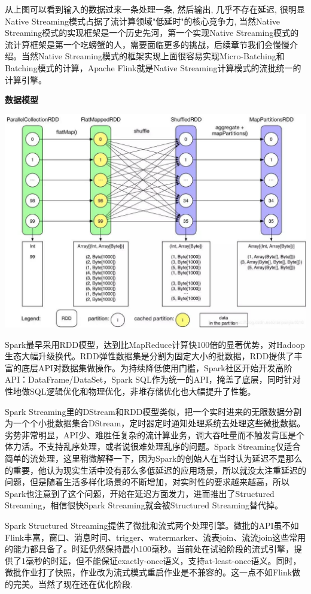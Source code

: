 \documentclass[oneside]{ctexbook}
\begin{document}
从上图可以看到输入的数据过来一条处理一条, 然后输出, 几乎不存在延迟, 很明显Native Streaming模式占据了流计算领域"低延时"的核心竞争力, 当然Native Streaming模式的实现框架是一个历史先河，第一个实现Native Streaming模式的流计算框架是第一个吃螃蟹的人，需要面临更多的挑战，后续章节我们会慢慢介绍。当然Native Streaming模式的框架实现上面很容易实现Micro-Batching和Batching模式的计算，Apache Flink就是Native Streaming计算模式的流批统一的计算引擎。

\textbf{数据模型}

\noindent \includegraphics[width=\textwidth]{shujumoxing1.jpg}

Spark最早采用RDD模型，达到比MapReduce计算快100倍的显著优势，对Hadoop生态大幅升级换代。RDD弹性数据集是分割为固定大小的批数据，RDD提供了丰富的底层API对数据集做操作。为持续降低使用门槛，Spark社区开始开发高阶API：DataFrame/DataSet，Spark SQL作为统一的API，掩盖了底层，同时针对性地做SQL逻辑优化和物理优化，非堆存储优化也大幅提升了性能。

Spark Streaming里的DStream和RDD模型类似，把一个实时进来的无限数据分割为一个个小批数据集合DStream，定时器定时通知处理系统去处理这些微批数据。劣势非常明显，API少、难胜任复杂的流计算业务，调大吞吐量而不触发背压是个体力活。不支持乱序处理，或者说很难处理乱序的问题。Spark Streaming仅适合简单的流处理，这里稍微解释一下，因为Spark的创始人在当时认为延迟不是那么的重要，他认为现实生活中没有那么多低延迟的应用场景，所以就没太注重延迟的问题，但是随着生活多样化场景的不断增加，对实时性的要求越来越高，所以Spark也注意到了这个问题，开始在延迟方面发力，进而推出了Structured Streaming，相信很快Spark Streaming就会被Structured Streaming替代掉。

Spark Structured Streaming提供了微批和流式两个处理引擎。微批的API虽不如Flink丰富，窗口、消息时间、trigger、watermarker、流表join、流流join这些常用的能力都具备了。时延仍然保持最小100毫秒。当前处在试验阶段的流式引擎，提供了1毫秒的时延，但不能保证exactly-once语义，支持at-least-once语义。同时，微批作业打了快照，作业改为流式模式重启作业是不兼容的。这一点不如Flink做的完美。当然了现在还在优化阶段.
\end{document}
